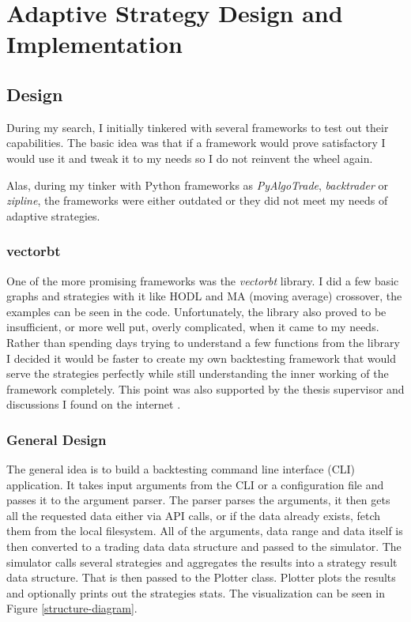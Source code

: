 \chapter{Adaptive Strategy Design and Implementation}
\label{chapter-implementation}

\section{Design}
During my search, I initially tinkered with several frameworks to test out their capabilities. The basic idea was that if a framework would prove satisfactory I would use it and tweak it to my needs so I do not reinvent the wheel again.

Alas, during my tinker with Python frameworks as \emph{PyAlgoTrade}, \emph{backtrader} or \emph{zipline}, the frameworks were either outdated or they did not meet my needs of adaptive strategies.

\subsection*{vectorbt}
One of the more promising frameworks was the \emph{vectorbt} library. I did a few basic graphs and strategies with it like HODL and MA (moving average) crossover, the examples can be seen in the code. Unfortunately, the library also proved to be insufficient, or more well put, overly complicated, when it came to my needs. Rather than spending days trying to understand a few functions from the library I decided it would be faster to create my own backtesting framework that would serve the strategies perfectly while still understanding the inner working of the framework completely. This point was also supported by the thesis supervisor and discussions I found on the internet \cite{reddit:custom-backtester}.

\subsection*{General Design}
The general idea is to build a backtesting command line interface (CLI) application. It takes input arguments from the CLI or a configuration file and passes it to the argument parser. The parser parses the arguments, it then gets all the requested data either via API calls, or if the data already exists, fetch them from the local filesystem. All of the arguments, data range and data itself is then converted to a trading data data structure and passed to the simulator. The simulator calls several strategies and aggregates the results into a strategy result data structure. That is then passed to the Plotter class. Plotter plots the results and optionally prints out the strategies stats. The visualization can be seen in Figure \ref{structure-diagram}.

